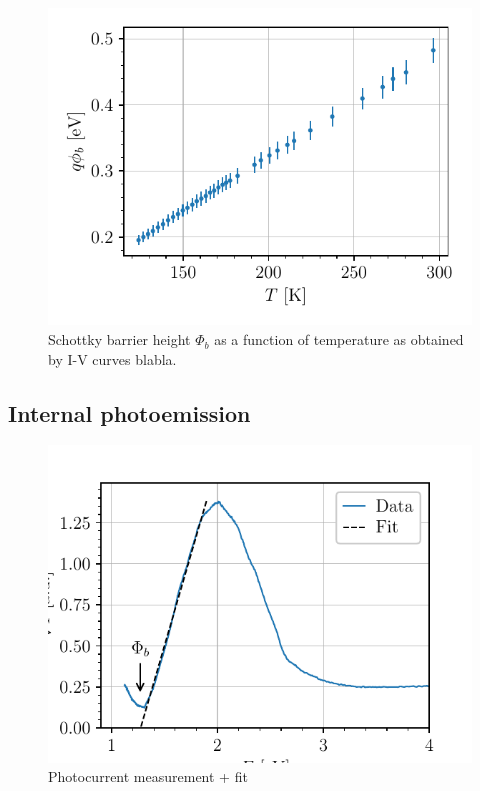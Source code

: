 \begin{figure}[htbp]
    \centering
    \includegraphics[scale=1]{figures/iv-schottky-potential-temperature.pdf}
    \caption{Schottky barrier height $\Phi_b$ as a function of temperature as obtained by I-V curves blabla. }
    \label{fig:iv-barrier-height}
\end{figure}

\subsection{Internal photoemission}
\begin{figure}[htbp]
    \centering
    \includegraphics[scale=1]{figures/photocurrent_curve.pdf}
    \caption{Photocurrent measurement + fit}
    \label{fig:photocurrent_curve}
\end{figure}

